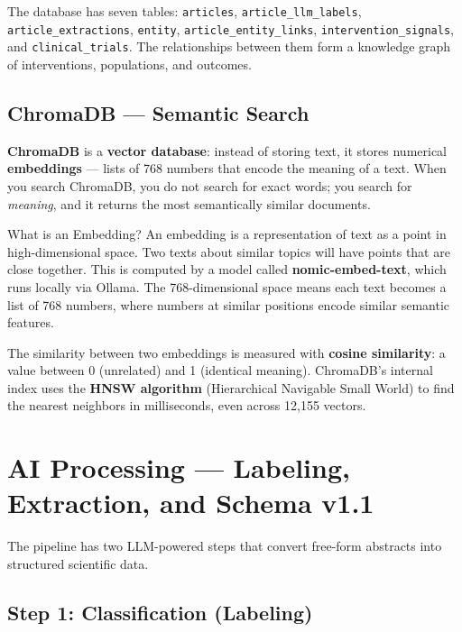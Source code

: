 \documentclass[11pt,a4paper]{article}
\begin{document}
The database has seven tables: \texttt{articles}, \texttt{article\_llm\_labels},
\texttt{article\_extractions}, \texttt{entity}, \texttt{article\_entity\_links},
\texttt{intervention\_signals}, and \texttt{clinical\_trials}. The relationships
between them form a knowledge graph of interventions, populations, and outcomes.

\subsection{ChromaDB --- Semantic Search}

\textbf{ChromaDB} is a \textbf{vector database}: instead of storing text, it stores
numerical \textbf{embeddings} --- lists of 768 numbers that encode the meaning of
a text. When you search ChromaDB, you do not search for exact words; you search
for \textit{meaning}, and it returns the most semantically similar documents.

\begin{concept}{What is an Embedding?}
An embedding is a representation of text as a point in high-dimensional space.
Two texts about similar topics will have points that are close together.
This is computed by a model called \textbf{nomic-embed-text}, which runs locally via
Ollama. The 768-dimensional space means each text becomes a list of 768 numbers,
where numbers at similar positions encode similar semantic features.
\end{concept}

The similarity between two embeddings is measured with \textbf{cosine similarity}:
a value between 0 (unrelated) and 1 (identical meaning). ChromaDB's internal index
uses the \textbf{HNSW algorithm} (Hierarchical Navigable Small World) to find the
nearest neighbors in milliseconds, even across 12,155 vectors.

\section{AI Processing --- Labeling, Extraction, and Schema v1.1}

The pipeline has two LLM-powered steps that convert free-form abstracts into
structured scientific data.

\subsection{Step 1: Classification (Labeling)}
\end{document}
